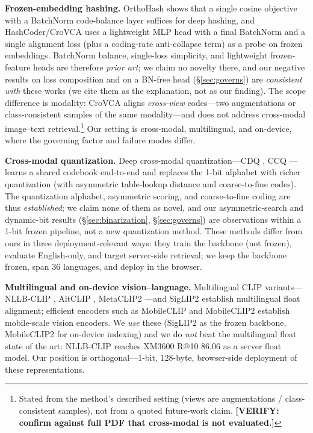 \documentclass[letterpaper]{article} %
\newcommand{\verify}[1]{\textbf{[VERIFY: #1]}}
\begin{document}
\textbf{Frozen-embedding hashing.} OrthoHash \cite{orthohash} shows that a single cosine objective with
a BatchNorm code-balance layer suffices for deep hashing, and HashCoder/CroVCA \cite{crovca} uses a
lightweight MLP head with a final BatchNorm and a single alignment loss (plus a coding-rate
anti-collapse term) as a probe on frozen embeddings. BatchNorm balance, single-loss simplicity, and
lightweight frozen-feature heads are therefore \emph{prior art}; we claim no novelty there, and our
negative results on loss composition and on a BN-free head (\S\ref{sec:governs}) are \emph{consistent
with} these works (we cite them as the explanation, not as our finding). The scope difference is
modality: CroVCA aligns \emph{cross-view} codes---two augmentations or class-consistent samples of the
same modality---and does not address cross-modal image--text retrieval.\footnote{Stated from the
method's described setting (views are augmentations / class-consistent samples), not from a quoted
future-work claim. \verify{confirm against full PDF that cross-modal is not evaluated.}} Our setting is
cross-modal, multilingual, and on-device, where the governing factor and failure modes differ.

\textbf{Cross-modal quantization.} Deep cross-modal quantization---CDQ \cite{cdq}, CCQ
\cite{ccq}---learns a shared codebook end-to-end and replaces the 1-bit alphabet with richer
quantization (with asymmetric table-lookup distance and coarse-to-fine codes). The quantization
alphabet, asymmetric scoring, and coarse-to-fine coding are thus \emph{established}; we claim none of
them as novel, and our asymmetric-search and dynamic-bit results (\S\ref{sec:binarization},
\S\ref{sec:governs}) are observations within a 1-bit frozen pipeline, not a new quantization method.
These methods differ from ours in three deployment-relevant ways: they train the backbone (not
frozen), evaluate English-only, and target server-side retrieval; we keep the backbone frozen, span 36
languages, and deploy in the browser.

\textbf{Multilingual and on-device vision--language.} Multilingual CLIP variants---NLLB-CLIP
\cite{nllbclip}, AltCLIP \cite{altclip}, MetaCLIP2 \cite{metaclip2}---and SigLIP2 \cite{siglip2}
establish multilingual float alignment; efficient encoders such as MobileCLIP \cite{mobileclip} and
MobileCLIP2 \cite{mobileclip2} establish mobile-scale vision encoders. We \emph{use} these (SigLIP2 as
the frozen backbone, MobileCLIP2 for on-device indexing) and we do \emph{not} beat the multilingual
float state of the art: NLLB-CLIP reaches XM3600 R@10 86.06 as a server float model. Our position is
orthogonal---1-bit, 128-byte, browser-side deployment of these representations.
\end{document}
